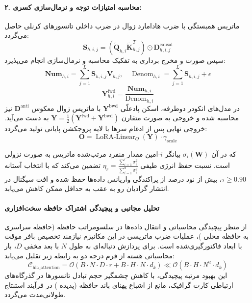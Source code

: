 \paragraph{۲. محاسبه امتیازات توجه و نرمال‌سازی کسری:}
ماتریس همبستگی با ضرب هادامارد زوال در ضرب داخلی تانسورهای کرنلی حاصل می‌گردد:
\begin{equation}
\mathbf{S}_{h, i, j} = \left(\tilde{\mathbf{Q}}_{h, i} \tilde{\mathbf{K}}_{h, j}^T\right) \odot \mathbf{D}_{h, i, j}^{\text{causal}}
\end{equation}
سپس صورت و مخرج برداری به تفکیک محاسبه و نرمال‌سازی انجام می‌پذیرد:
\begin{equation}
\mathbf{Num}_{h, i} = \sum_{j=1}^L \mathbf{S}_{h, i, j} \mathbf{V}_{h, j}, \quad
\operatorname{Denom}_{h, i} = \sum_{j=1}^L \mathbf{S}_{h, i, j} + \epsilon
\end{equation}
\begin{equation}
\mathbf{Y}_{h, i}^{\text{fwd}} = \frac{\mathbf{Num}_{h, i}}{\operatorname{Denom}_{h, i}}
\end{equation}
در مدل‌های انکودر دوطرفه، اسکن پادعلّی $\mathbf{Y}^{\text{bwd}}$ با ماتریس زوال معکوس $\mathbf{D}^{\text{anti}}$ نیز محاسبه شده و خروجی به صورت متقارن $\mathbf{Y} = \frac{1}{2}(\mathbf{Y}^{\text{fwd}} + \mathbf{Y}^{\text{bwd}})$ به دست می‌آید. خروجی نهایی پس از ادغام سرها با لایه پروجکشن پایانی تولید می‌گردد:
\begin{equation}
\mathbf{O} = \operatorname{LoRA-Linear}_O(\mathbf{Y}) \cdot \gamma_{\text{scale}}
\end{equation}

که در آن $\sigma_i(\mathbf{W})$ بیانگر $i$-امین مقدار منفرد مرتب‌شده ماتریس به صورت نزولی است. نسبت حفظ انرژی طیفی $\eta_r = \frac{\sum_{i=1}^r \sigma_i^2}{\sum_{i=1}^{d} \sigma_i^2}$ تضمین می‌کند که با انتخاب آستانه $\tau \ge 0.90$، بیش از نود درصد از پراکندگی واریانس داده‌ها حفظ شده و افت سیگنال در انتشار گرادیان رو به عقب به حداقل ممکن کاهش می‌یابد.

\paragraph{تحلیل مجانبی و پیچیدگی اشتراک حافظه سخت‌افزاری}
از منظر پیچیدگی محاسباتی و انتقال داده‌ها در سلسومراتب حافظه (حافظه سراسری  به حافظه محلی )، عملیات ضرب ماتریسی در این مکانیزم نیازمند تخصیص بافر موقت با ابعاد فاکتورگیری‌شده است. برای پردازش دنباله‌ای به طول $N$ با بعد مخفی $D$، بار محاسباتی هسته از فرم درجه دو به رابطه زیر تقلیل می‌یابد:
\begin{equation}
\label{eq:complexity_hla_attention}
\mathcal{C}_{\text{hla\_attention}} = \mathcal{O}\left( B \cdot N \cdot D \cdot r + B \cdot H \cdot N \cdot d_k \right) \ll \mathcal{O}\left( B \cdot H \cdot N^2 \cdot d_k \right)
\end{equation}
این بهبود مرتبه پیچیدگی، با کاهش چشمگیر حجم تبادل تانسورها در گذرگاه‌های ارتباطی کارت گرافیک، مانع از اشباع پهنای باند حافظه (پدیده ) در فرآیند استنتاج طولانی‌مدت می‌گردد.
